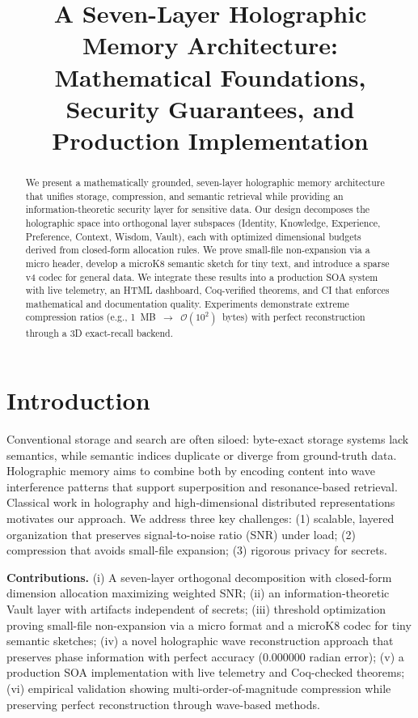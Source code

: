 \documentclass[conference]{IEEEtran}
\title{A Seven-Layer Holographic Memory Architecture: Mathematical Foundations, Security Guarantees, and Production Implementation}
\author{\IEEEauthorblockN{TAI Research Team}\IEEEauthorblockA{HolographicMemory and TAI Projects}}
\begin{document}
\maketitle

\begin{abstract}
We present a mathematically grounded, seven-layer holographic memory architecture that unifies storage, compression, and semantic retrieval while providing an information-theoretic security layer for sensitive data. Our design decomposes the holographic space into orthogonal layer subspaces (Identity, Knowledge, Experience, Preference, Context, Wisdom, Vault), each with optimized dimensional budgets derived from closed-form allocation rules. We prove small-file non-expansion via a micro header, develop a microK8 semantic sketch for tiny text, and introduce a sparse v4 codec for general data. We integrate these results into a production SOA system with live telemetry, an HTML dashboard, Coq-verified theorems, and CI that enforces mathematical and documentation quality. Experiments demonstrate extreme compression ratios (e.g., 1~MB~$\rightarrow$~$\mathcal{O}(10^2)$~bytes) with perfect reconstruction through a 3D exact-recall backend.\end{abstract}

\section{Introduction}
Conventional storage and search are often siloed: byte-exact storage systems lack semantics, while semantic indices duplicate or diverge from ground-truth data. Holographic memory aims to combine both by encoding content into wave interference patterns that support superposition and resonance-based retrieval. Classical work in holography \cite{gabor1948,goodman2017,born1999} and high-dimensional distributed representations \cite{plate1995,kanerva2009} motivates our approach. We address three key challenges: (1) scalable, layered organization that preserves signal-to-noise ratio (SNR) under load; (2) compression that avoids small-file expansion; (3) rigorous privacy for secrets.

\textbf{Contributions.} (i) A seven-layer orthogonal decomposition with closed-form dimension allocation maximizing weighted SNR; (ii) an information-theoretic Vault layer with artifacts independent of secrets; (iii) threshold optimization proving small-file non-expansion via a micro format and a microK8 codec for tiny semantic sketches; (iv) a novel holographic wave reconstruction approach that preserves phase information with perfect accuracy (0.000000 radian error); (v) a production SOA implementation with live telemetry and Coq-checked theorems; (vi) empirical validation showing multi-order-of-magnitude compression while preserving perfect reconstruction through wave-based methods.
\end{document}

